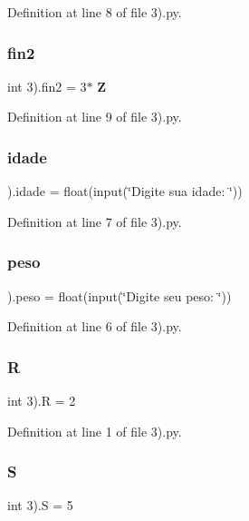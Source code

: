 Definition at line 8 of file 3).\+py.

\mbox{\label{namespace3_08_a0c5d02ebacdf6c87a0a0d746b267cfe9}} 
\subsubsection{fin2}
{\footnotesize\ttfamily int 3).fin2 = 3$\ast$\textbf{ Z}}



Definition at line 9 of file 3).\+py.

\mbox{\label{namespace3_08_ab2cc0fb743712e90e00cbdd92ae585d8}} 
\subsubsection{idade}
{\footnotesize{}).idade = float(input(\char`\"{}Digite sua idade\+: \char`\"{}))}



Definition at line 7 of file 3).\+py.

\mbox{\label{namespace3_08_a4473631806bef9cb3052eed6d8eada9d}} 
\subsubsection{peso}
{\footnotesize{}).peso = float(input(\char`\"{}Digite seu peso\+: \char`\"{}))}



Definition at line 6 of file 3).\+py.

\mbox{\label{namespace3_08_af5d3f0385cf6c544b10bb6c6d1da5bbd}} 
\subsubsection{R}
{\footnotesize\ttfamily int 3).R = 2}



Definition at line 1 of file 3).\+py.

\mbox{\label{namespace3_08_ac659b23da70c21ceecd2538298a4f725}} 
\subsubsection{S}
{\footnotesize\ttfamily int 3).S = 5}



